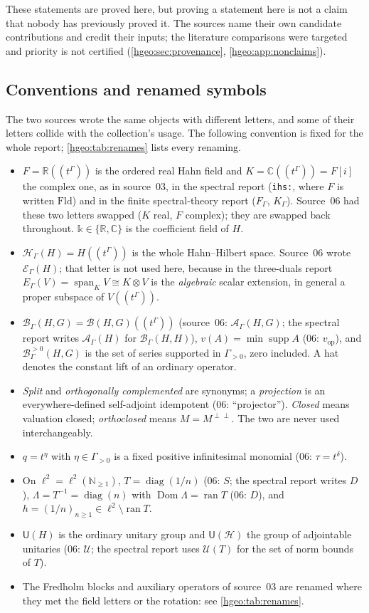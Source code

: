\documentclass[11pt,letterpaper]{article}
\numberwithin{equation}{section}
\theoremstyle{definition}
\theoremstyle{remark}
\newcommand{\R}{\mathbb R}
\newcommand{\C}{\mathbb C}
\newcommand{\N}{\mathbb N}
\newcommand{\kk}{\mathbb k}
\newcommand{\F}{F}
\newcommand{\K}{K}
\newcommand{\HH}[1]{\mathscr H_\Gamma(#1)}
\newcommand{\BB}[2]{\mathscr B_\Gamma(#1,#2)}
\newcommand{\BH}{\mathscr B_\Gamma(H,H)}
\newcommand{\Bpos}[2]{\mathscr B^{>0}_\Gamma(#1,#2)}
\newcommand{\supp}{\operatorname{supp}}
\newcommand{\ran}{\operatorname{ran}}
\newcommand{\Dom}{\operatorname{Dom}}
\newcommand{\Span}{\operatorname{span}}
\newcommand{\diag}{\operatorname{diag}}
\newcommand{\Un}{\mathsf U}
\newcommand{\cH}{\mathcal H}
\newcommand{\replabel}[1]{\nolinkurl{#1}}
\begin{document}
These statements are proved here, but proving a statement here is not a
claim that nobody has previously proved it. The sources name their own
candidate contributions and credit their inputs; the literature comparisons
were targeted and priority is not certified (\cref{hgeo:sec:provenance},
\cref{hgeo:app:nonclaims}).

\subsection{Conventions and renamed symbols}\label{hgeo:sub:conventions}
The two sources wrote the same objects with different letters, and some of
their letters collide with the collection's usage. The following convention
is fixed for the whole report; \cref{hgeo:tab:renames} lists every renaming.
\begin{itemize}
\item $\F=\R((t^\Gamma))$ is the ordered real Hahn field and
$\K=\C((t^\Gamma))=\F[i]$ the complex one, as in source~03, in the spectral
report (\replabel{ihs:}, where $\F$ is written $\mathrm{Fld}$) and in the
finite spectral-theory report ($F_\Gamma$, $K_\Gamma$). Source~06 had these
two letters swapped ($K$ real, $F$ complex); they are swapped back
throughout. $\kk\in\{\R,\C\}$ is the coefficient field of $H$.
\item $\HH{H}=H((t^\Gamma))$ is the whole Hahn--Hilbert space. Source~06
wrote $\mathcal E_\Gamma(H)$; that letter is not used here, because in
the three-duals report $E_\Gamma(V)=\Span_\K V\cong\K\otimes V$ is the
\emph{algebraic} scalar extension, in general a proper subspace of
$V((t^\Gamma))$.
\item $\BB{H}{G}=\mathcal B(H,G)((t^\Gamma))$ (source~06:
$\mathcal A_\Gamma(H,G)$; the spectral report writes $\mathcal A_\Gamma(H)$
for $\BH$), $v(A)=\min\supp A$ (06: $v_{\mathrm{op}}$), and
$\Bpos{H}{G}$ is the set of series supported in $\Gamma_{>0}$, zero
included. A hat denotes the constant lift of an ordinary operator.
\item \emph{Split} and \emph{orthogonally complemented} are synonyms; a
\emph{projection} is an everywhere-defined self-adjoint idempotent (06:
``projector''). \emph{Closed} means valuation closed; \emph{orthoclosed}
means $M=M^{\perp\perp}$. The two are never used interchangeably.
\item $q=t^\eta$ with $\eta\in\Gamma_{>0}$ is a fixed positive
infinitesimal monomial (06: $\tau=t^\delta$).
\item On $\ell^2=\ell^2(\N_{\ge1})$, $T=\diag(1/n)$ (06: $S$; the spectral
report writes $D$), $\Lambda=T^{-1}=\diag(n)$ with $\Dom\Lambda=\ran T$
(06: $D$), and $h=(1/n)_{n\ge1}\in\ell^2\setminus\ran T$.
\item $\Un(H)$ is the ordinary unitary group and $\Un(\cH)$ the group of
adjointable unitaries (06: $\mathcal U$; the spectral report uses
$\mathcal U(T)$ for the set of norm bounds of $T$).
\item The Fredholm blocks and auxiliary operators of source~03 are renamed
where they met the field letters or the rotation: see
\cref{hgeo:tab:renames}.
\end{itemize}
\end{document}
